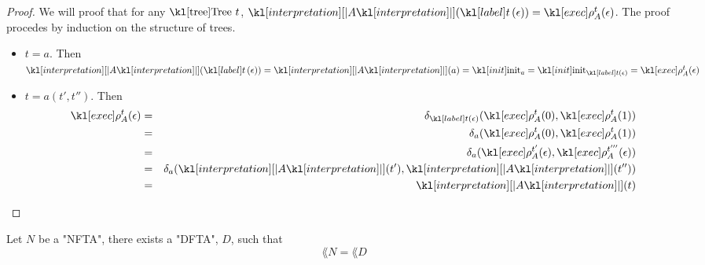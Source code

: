 \documentclass{article}
\begin{document}
\begin{proof}
	We will proof that for any $\tree \ t$, $\interpret A (\tlabel t {\epsilon}) = \exec A t (\epsilon)$.
	The proof procedes by induction on the structure of trees.
	\begin{itemize}
		\item $t = a$. Then
		      $\interpret A (\tlabel t {\epsilon}) = \interpret A (a)=  \init_a = \init_{\tlabel t {\epsilon}} = \exec A t (\epsilon)$
		\item $t = a(t',t'')$. Then
		      \begin{eqnarray*}
			      \exec A t (\epsilon)  &=& \delta_{\tlabel t {\epsilon}}(\exec A t (0), \exec A t (1)) \\
			      &=& \delta_a (\exec A t (0), \exec A t (1)) \\
			      &=& \delta_a (\exec A {t'}(\epsilon), \exec A {t'''} (\epsilon)) \\
			      &=& \delta_a (\interpret A (t'), \interpret A (t'')) \\
			      &=& \interpret A (t)
		      \end{eqnarray*}
	\end{itemize}
\end{proof}

\begin{theorem}
	Let $N$ be a "NFTA", there exists a "DFTA", $D$, such that
	$$\lang N = \lang D$$
\end{theorem}
\end{document}
